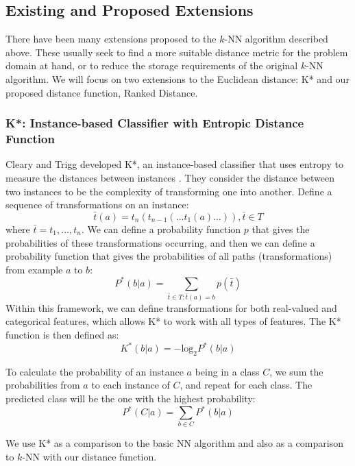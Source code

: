 \subsection{Existing and Proposed Extensions}
There have been many extensions proposed to the $k$-NN algorithm described
above. These usually seek to find a more suitable distance metric for the
problem domain at hand, or to reduce the storage requirements of the original
$k$-NN algorithm. We will focus on two extensions to the Euclidean distance:
K* and our proposed distance function, Ranked Distance.

\subsubsection{K*: Instance-based Classifier with Entropic Distance Function}
Cleary and Trigg developed K*, an instance-based classifier that uses entropy
to measure the distances between instances \cite{Cleary1995}. They consider
the distance between two instances to be the complexity of transforming one
into another. Define a sequence of transformations on an instance:
\begin{equation*}
\bar{t}(a) = t_n(t_{n-1}(\ldots t_1(a)\ldots)), \bar{t} \in T
\end{equation*}
where $\bar{t} = t_1,\ldots,t_n$. We can define a probability function $p$
that gives the probabilities of these transformations occurring, and then we
can define a probability function that gives the probabilities of all paths
(transformations) from example $a$ to $b$:
\begin{equation*}
P^*(b|a) = \sum_{\bar{t}\in T:\bar{t}(a)=b} p(\bar{t})
\end{equation*}
Within this framework, we can define transformations for both real-valued and
categorical features, which allows K* to work with all types of features.
The K* function is then defined as:
\begin{equation*}
K^*(b|a) = -\mathrm{log}_2P^*(b|a)
\end{equation*}

To calculate the probability of an instance $a$ being in a class $C$, we sum
the probabilities from $a$ to each instance of $C$, and repeat for each class.
The predicted class will be the one with the highest probability:
\begin{equation*}
P^*(C|a) = \sum_{b\in C} P^*(b|a)
\end{equation*}

We use K* as a comparison to the basic NN algorithm and also as a comparison
to $k$-NN with our distance function.

